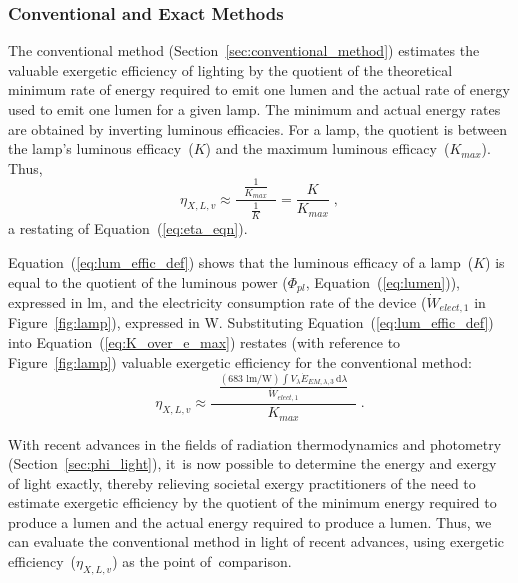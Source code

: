 \documentclass[energies,article,accept,moreauthors,pdftex]{Definitions/mdpi}\usepackage[]{graphicx}\usepackage[]{color}
\begin{document}
\subsubsection{Conventional and Exact Methods} 
\label{sec:previous_approach}

The conventional method (Section~\ref{sec:conventional_method}) 
estimates the valuable exergetic efficiency of lighting by the quotient of
the theoretical minimum rate of energy required to emit one lumen and
the actual rate of energy used to emit one lumen 
for a given lamp. 
The minimum and actual energy rates are obtained 
by inverting luminous efficacies.
For a lamp, the quotient is between the lamp's luminous efficacy~($K$)
and the maximum luminous efficacy~($K_{max}$).
Thus, 
\begin{equation} \label{eq:K_over_e_max}
  \eta_{X,L,v} \approx \frac{\; \; \frac{1}{K_{max}} \; \; }{\frac{1}{K}}
       = \frac{K}{K_{max}} \; ,
\end{equation}
% 
a restating of Equation~(\ref{eq:eta_eqn}).

Equation~(\ref{eq:lum_effic_def}) shows that 
the luminous efficacy of a lamp~($K$) is equal to the quotient
of the luminous power ($\Phi_{pl}$, Equation~(\ref{eq:lumen})), expressed in lm, and
the electricity consumption rate of the device
($\dot{W}_{elect,1}$ in Figure~\ref{fig:lamp}), expressed in W.
Substituting Equation~(\ref{eq:lum_effic_def}) into Equation~(\ref{eq:K_over_e_max}) restates
(with reference to Figure~\ref{fig:lamp})
valuable exergetic efficiency for the conventional method:
\begin{equation} \label{eq:prev_eta_X_v_light}
  \eta_{X,L,v} \approx \frac{ \; \; \frac{(683 \text{ lm/W}) \int V_\lambda \dot{E}_{EM,\lambda,3} \,
          \mathrm{d}\lambda}{\dot{W}_{elect,1}} \; \;}{K_{max}} \; .
\end{equation}

With recent advances in the fields of radiation thermodynamics and photometry
(Section~\ref{sec:phi_light}),
\mbox{it is} now possible to determine the energy and exergy of light exactly, 
thereby relieving societal exergy practitioners
of the need to estimate exergetic efficiency
by the quotient of
the minimum energy required to produce a lumen and
the actual energy required to produce a lumen.
Thus, we can evaluate the conventional method in light of recent advances, 
using exergetic efficiency~($\eta_{X,L,v}$) as the point \mbox{of comparison}.
\end{document}
